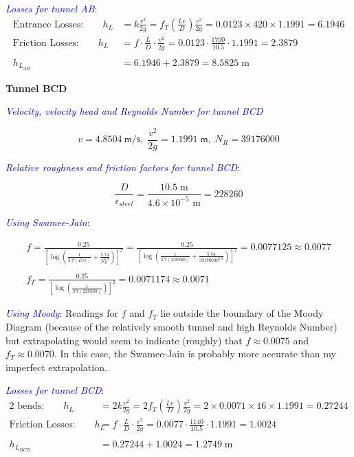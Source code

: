 \documentclass[10pt]{amsart}
\begin{document}
\textcolor{blue}{\em Losses for tunnel AB}:
\begin{align*}
	\text{Entrance Losses:}\qquad h_{L} & = k\frac{v^2}{2g} =                        
	f_T\left(\frac{Le}{D}\right)\frac{v^2}{2g}=0.0123\times 420\times 1.1991 = 6.1946\\
	\text{Friction Losses:}\qquad h_{L} & =  f\cdot\frac{L}{D} \cdot\frac{v^2}{2g} = 
	0.0123\cdot\frac{1700}{10.5}\cdot1.1991 = 2.3879\\\\
	h_{L_{AB}}                          & = 6.1946+2.3879 = 8.5825\;\text{m}         
\end{align*}

\textbf{Tunnel BCD}

\textcolor{blue}{\em Velocity, velocity head and Reynolds Number for tunnel BCD }

\[
	v = 4.8504\mathsf{\ m/s},\;\frac{v^2}{2g} = 1.1991\mathsf{\; m},\; N_R = 39176000
\]

\textcolor{blue}{\em Relative roughness and friction factors for tunnel BCD}:

\[
	\frac{D}{\epsilon_{steel}} = \frac{10.5\;\text{m}}{4.6\times10^{-5}\text{ m}} = 228260
\]

\textcolor{blue}{\em Using Swamee-Jain}:

\begin{gather*}
	f = \frac{0.25}{\left[\log\left(\frac{1}{3.7(D/\epsilon)}+\frac{5.74}{N_R^{0.9}}\right)\right]^2} =
	\frac{0.25}{\left[\log\left(\frac{1}{3.7(228260)}+\frac{5.74}{39176000^{0.9}}\right)\right]^2}=0.0077125\approx 0.0077
	\\\\
	f_T = \frac{0.25}{\left[\log\left(\frac{1}{3.7(228260)}\right)\right]^2} = 0.0071174\approx 0.0071
\end{gather*}

\textcolor{blue}{\em Using Moody}:
Readings for $f$ and $f_T$ lie outside the boundary of the Moody Diagram (because of the relatively smooth tunnel and
high Reynolds Number) but extrapolating would seem to indicate (roughly) that $f\approx 0.0075$ and $f_T\approx
0.0070$. In this case, the Swamee-Jain is probably more accurate than my imperfect extrapolation.

\textcolor{blue}{\em Losses for tunnel BCD}:
\begin{align*}
	\text{2 bends:}\qquad h_{L}         & = 2k\frac{v^2}{2g} =                      
	2f_T\left(\frac{Le}{D}\right)\frac{v^2}{2g}=2\times 0.0071\times 16\times 1.1991 = 0.27244\\
	\text{Friction Losses:}\qquad h_{L} & = f\cdot\frac{L}{D} \cdot\frac{v^2}{2g} = 
	0.0077\cdot\frac{1140}{10.5}\cdot1.1991 = 1.0024\\\\
	h_{L_{BCD}}                         & = 0.27244+1.0024 = 1.2749\;\text{m}       
\end{align*}
\end{document}
